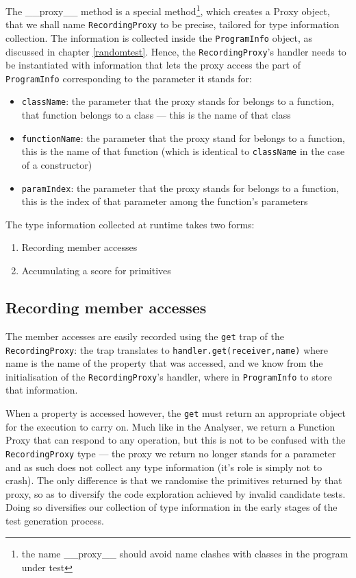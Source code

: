 The \_\_proxy\_\_ method is a special method\footnote{the name \_\_proxy\_\_ should avoid name clashes with classes in the program under test}, which creates a Proxy object, that we shall name \texttt{RecordingProxy} to be precise, tailored for type information collection. The information is collected inside the \texttt{ProgramInfo} object, as discussed in chapter \ref{randomtest}. Hence, the \texttt{RecordingProxy}'s handler needs to be instantiated with information that lets the proxy access the part of \texttt{ProgramInfo} corresponding to the parameter it stands for:

\begin{itemize}
   \item \texttt{className}: the parameter that the proxy stands for belongs to a function, that function belongs to a class --- this is the name of that class
   \item \texttt{functionName}: the parameter that the proxy stand for belongs to a function, this is the name of that function (which is identical to \texttt{className} in the case of a constructor)
   \item \texttt{paramIndex}: the parameter that the proxy stands for belongs to a function, this is the index of that parameter among the function's parameters
\end{itemize}

The type information collected at runtime takes two forms:

\begin{enumerate}
   \item Recording member accesses
   \item Accumulating a score for primitives
\end{enumerate}

\subsection{Recording member accesses}
The member accesses are easily recorded using the \texttt{get} trap of the \texttt{RecordingProxy}: the trap translates to \texttt{handler.get(receiver,name)} where name is the name of the property that was accessed, and we know from the initialisation of the \texttt{RecordingProxy}'s handler, where in \texttt{ProgramInfo} to store that information.

When a property is accessed however, the \texttt{get} must return an appropriate object for the execution to carry on. Much like in the \textsf{Analyser}, we return a Function Proxy that can respond to any operation, but this is not to be confused with the \texttt{RecordingProxy} type --- the proxy we return no longer stands for a parameter and as such does not collect any type information (it's role is simply not to crash). The only difference is that we randomise the primitives returned by that proxy, so as to diversify the code exploration achieved by invalid candidate tests. Doing so diversifies our collection of type information in the early stages of the test generation process.

